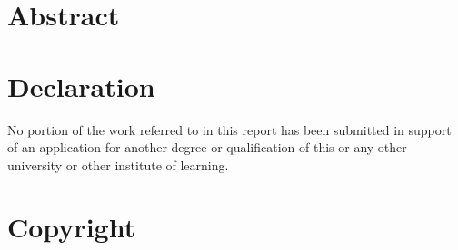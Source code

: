 \section*{Abstract}

\clearpage

\section*{Declaration}

No portion of the work referred to in this report has been
submitted in support of an application for another degree or
qualification of this or any other university or other institute
of learning.

\clearpage

\section*{Copyright}

